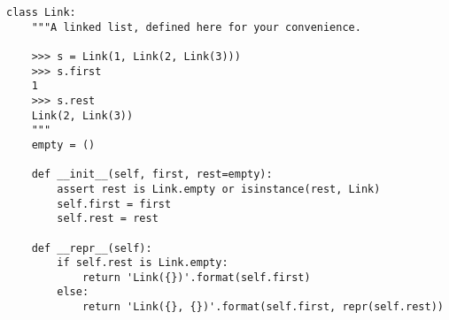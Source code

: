 \documentclass[twoside]{article}
\begin{document}
\begin{enumerate}
\begin{verbatim}
class Link:
    """A linked list, defined here for your convenience.

    >>> s = Link(1, Link(2, Link(3)))
    >>> s.first
    1
    >>> s.rest
    Link(2, Link(3))
    """
    empty = ()

    def __init__(self, first, rest=empty):
        assert rest is Link.empty or isinstance(rest, Link)
        self.first = first
        self.rest = rest

    def __repr__(self):
        if self.rest is Link.empty:
            return 'Link({})'.format(self.first)
        else:
            return 'Link({}, {})'.format(self.first, repr(self.rest))
\end{verbatim}

\end{enumerate}
\end{document}
